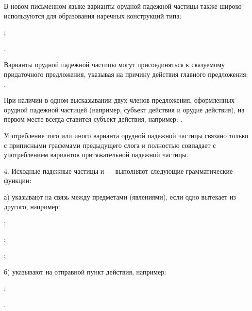 В новом письменном языке варианты орудной падежной частицы также широко используются для образования наречных конструкций типа:
\begin{prfsample}
	\item {};
	\item {}.
\end{prfsample}

Варианты орудной падежной частицы могут присоединяться к сказуемому придаточного предложения, указывая на причину действия главного предложения: 
.

При наличии в одном высказывании двух членов предложения, оформленных орудной падежной частицей (например, субъект действия и орудие действия), на первом месте всегда ставится субъект действия, например:
.

Употребление того или иного варианта орудной падежной частицы связано только с приписными графемами предыдущего слога и полностью совпадает с употреблением вариантов притяжательной падежной частицы.

4. Исходные падежные частицы  и  --- выполняют следующие грамматические функции:

а) указывают на связь между предметами (явлениями), если одно вытекает из другого, например:
\begin{prfsample}
	\item {};
	\item {};
	\item {};
\end{prfsample}

б) указывают на отправной пункт действия, например:
\begin{prfsample}
	\item {};
	\item {}.
\end{prfsample}

